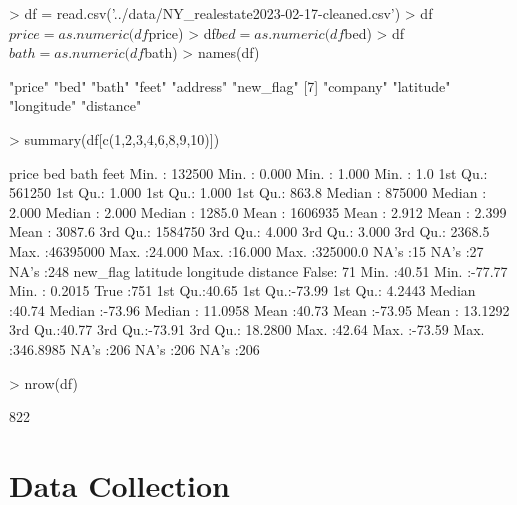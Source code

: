 \documentclass[11pt, a4paper]{article}
\begin{document}
\begin{Schunk}
\begin{Sinput}
> df = read.csv('../data/NY_realestate2023-02-17-cleaned.csv')
> df$price = as.numeric(df$price)
> df$bed = as.numeric(df$bed)
> df$bath = as.numeric(df$bath)
> names(df)
\end{Sinput}
\begin{Soutput}
 [1] "price"     "bed"       "bath"      "feet"      "address"   "new_flag" 
 [7] "company"   "latitude"  "longitude" "distance" 
\end{Soutput}
\begin{Sinput}
> summary(df[c(1,2,3,4,6,8,9,10)])
\end{Sinput}
\begin{Soutput}
     price               bed              bath             feet         
 Min.   :  132500   Min.   : 0.000   Min.   : 1.000   Min.   :     1.0  
 1st Qu.:  561250   1st Qu.: 1.000   1st Qu.: 1.000   1st Qu.:   863.8  
 Median :  875000   Median : 2.000   Median : 2.000   Median :  1285.0  
 Mean   : 1606935   Mean   : 2.912   Mean   : 2.399   Mean   :  3087.6  
 3rd Qu.: 1584750   3rd Qu.: 4.000   3rd Qu.: 3.000   3rd Qu.:  2368.5  
 Max.   :46395000   Max.   :24.000   Max.   :16.000   Max.   :325000.0  
                    NA's   :15       NA's   :27       NA's   :248       
  new_flag      latitude       longitude         distance       
 False: 71   Min.   :40.51   Min.   :-77.77   Min.   :  0.2015  
 True :751   1st Qu.:40.65   1st Qu.:-73.99   1st Qu.:  4.2443  
             Median :40.74   Median :-73.96   Median : 11.0958  
             Mean   :40.73   Mean   :-73.95   Mean   : 13.1292  
             3rd Qu.:40.77   3rd Qu.:-73.91   3rd Qu.: 18.2800  
             Max.   :42.64   Max.   :-73.59   Max.   :346.8985  
             NA's   :206     NA's   :206      NA's   :206       
\end{Soutput}
\begin{Sinput}
> nrow(df)
\end{Sinput}
\begin{Soutput}
[1] 822
\end{Soutput}
\end{Schunk}

\section{Data Collection}
\end{document}
